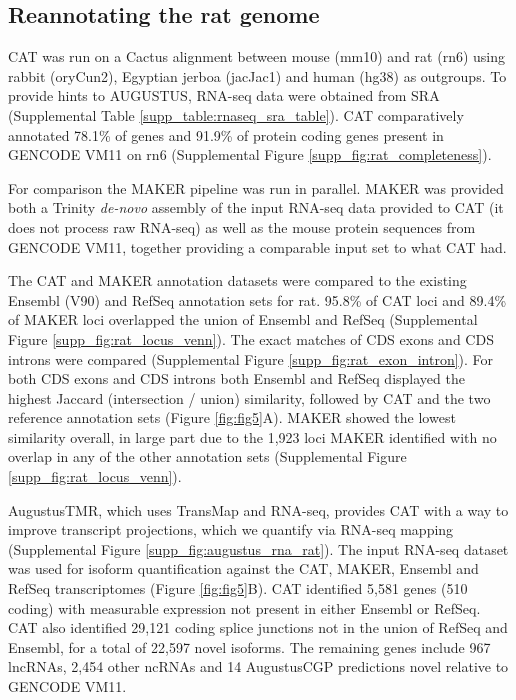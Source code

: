 \documentclass[fleqn,10pt]{wlscirep}
\begin{document}
\subsection*{Reannotating the rat genome}
	CAT was run on a Cactus alignment between mouse (mm10) and rat (rn6) using rabbit (oryCun2), Egyptian jerboa (jacJac1) and human (hg38) as outgroups. To provide hints to AUGUSTUS, RNA-seq data were obtained from SRA \cite{fushan2015gene,cortez2014origins,liu2016identification} (Supplemental Table \ref{supp_table:rnaseq_sra_table}). CAT comparatively annotated 78.1\% of genes and 91.9\% of protein coding genes present in GENCODE VM11 on rn6 (Supplemental Figure \ref{supp_fig:rat_completeness}). 
    
For comparison the MAKER pipeline \cite{cantarel2008maker} was run in parallel. MAKER was provided both a Trinity \cite{haas2013novo} \textit{de-novo} assembly of the input RNA-seq data provided to CAT (it does not process raw RNA-seq) as well as the mouse protein sequences from GENCODE VM11, together providing a comparable input set to what CAT had. 

The CAT and MAKER annotation datasets were compared to the existing Ensembl (V90) and RefSeq annotation sets for rat. 95.8\% of CAT loci and 89.4\% of MAKER loci overlapped the union of Ensembl and RefSeq (Supplemental Figure \ref{supp_fig:rat_locus_venn}). The exact matches of CDS exons and CDS introns were compared (Supplemental Figure \ref{supp_fig:rat_exon_intron}). For both CDS exons and CDS introns both Ensembl and RefSeq displayed the highest Jaccard (intersection / union) similarity, followed by CAT and the two reference annotation sets (Figure \ref{fig:fig5}A). MAKER showed the lowest similarity overall, in large part due to the 1,923 loci MAKER identified with no overlap in any of the other annotation sets (Supplemental Figure \ref{supp_fig:rat_locus_venn}). 

AugustusTMR, which uses TransMap and RNA-seq, provides CAT with a way to improve transcript projections, which we quantify via RNA-seq mapping (Supplemental Figure \ref{supp_fig:augustus_rna_rat}). The input RNA-seq dataset was used for isoform quantification against the CAT, MAKER, Ensembl and RefSeq transcriptomes (Figure \ref{fig:fig5}B). CAT identified 5,581 genes (510 coding) with measurable expression not present in either Ensembl or RefSeq. CAT also identified 29,121 coding splice junctions not in the union of RefSeq and Ensembl, for a total of 22,597 novel isoforms. The remaining genes include 967 lncRNAs, 2,454 other ncRNAs and 14 AugustusCGP predictions novel relative to GENCODE VM11.
\end{document}
